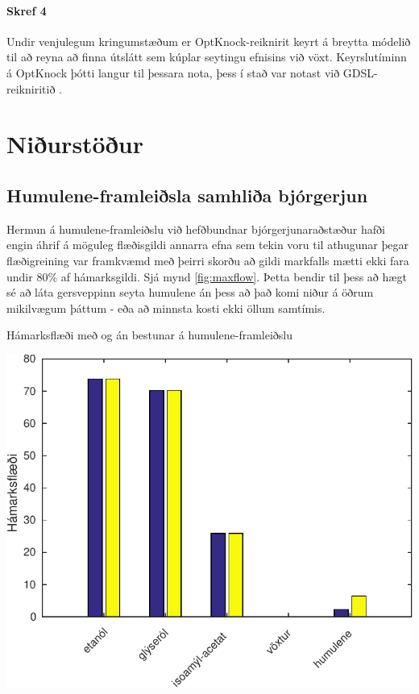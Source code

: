 \documentclass[11pt]{article}
\makeatletter
\newenvironment{figureonecolumn}{\begin{minipage}{\linewidth}\begin{center}\def\@captype{figure}}{\end{center}\end{minipage}}
\makeatother
\begin{document}
\begin{multicols}{2}
\paragraph{Skref 4}
Undir venjulegum kringumstæðum er OptKnock-reiknirit keyrt á breytta módelið til að reyna að finna útslátt sem kúplar seytingu efnisins við vöxt. Keyrslutíminn á OptKnock þótti langur til þessara nota, þess í stað var notast við GDSL-reikniritið \cite{lun2009large}.

\section{Niðurstöður}
\subsection{Humulene-framleiðsla samhliða bjórgerjun}
Hermun á humulene-framleiðslu við hefðbundnar bjórgerjunaraðstæður hafði engin áhrif á möguleg flæðisgildi annarra efna sem tekin voru til athugunar þegar flæðigreining var framkvæmd með þeirri skorðu að gildi markfalls mætti ekki fara undir 80\% af hámarksgildi. Sjá mynd \ref{fig:maxflow}. Þetta bendir til þess að hægt sé að láta gersveppinn seyta humulene án þess að það komi niður á öðrum mikilvægum þáttum - eða að minnsta kosti ekki öllum samtímis.

\begin{figureonecolumn}
\caption{Hámarksflæði með og án bestunar á humulene-framleiðslu}
\label{fig:maxflow}
\includegraphics[width=\linewidth]{Pics/BrewingMetMaxFlow}
\end{figureonecolumn}


\end{multicols}
\end{document}
